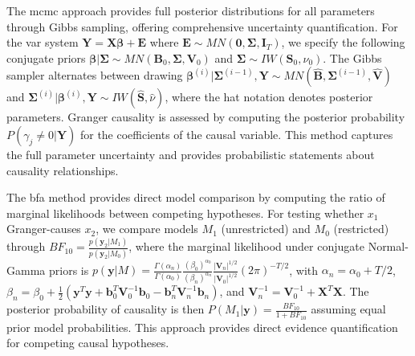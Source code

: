 \documentclass[preprint, 3p,
authoryear]{elsarticle} %
\begin{document}
The \gls{mcmc} approach provides full posterior distributions for all
parameters through Gibbs sampling, offering comprehensive uncertainty
quantification. For the \gls{var} system
\(\mathbf{Y} = \mathbf{X}\boldsymbol{\beta} + \mathbf{E}\) where
\(\mathbf{E} \sim MN(\mathbf{0}, \boldsymbol{\Sigma}, \mathbf{I}_T)\),
we specify the following conjugate priors
\(\boldsymbol{\beta} | \boldsymbol{\Sigma} \sim MN(\mathbf{B}_0, \boldsymbol{\Sigma}, \mathbf{V}_0)\)
and \(\boldsymbol{\Sigma} \sim IW(\mathbf{S}_0, \nu_0)\). The Gibbs
sampler alternates between drawing
\(\boldsymbol{\beta}^{(i)} | \boldsymbol{\Sigma}^{(i-1)}, \mathbf{Y} \sim MN(\hat{\mathbf{B}}, \boldsymbol{\Sigma}^{(i-1)}, \hat{\mathbf{V}})\)
and
\(\boldsymbol{\Sigma}^{(i)} | \boldsymbol{\beta}^{(i)}, \mathbf{Y} \sim IW(\hat{\mathbf{S}}, \hat{\nu})\),
where the hat notation denotes posterior parameters. Granger causality
is assessed by computing the posterior probability
\(P(\gamma_j \neq 0 | \mathbf{Y})\) for the coefficients of the causal
variable. This method captures the full parameter uncertainty and
provides probabilistic statements about causality relationships.

The \gls{bfa} method provides direct model comparison by computing the
ratio of marginal likelihoods between competing hypotheses. For testing
whether \(x_1\) Granger-causes \(x_2\), we compare models \(M_1\)
(unrestricted) and \(M_0\) (restricted) through
\(BF_{10} = \frac{p(\mathbf{y}_2 | M_1)}{p(\mathbf{y}_2 | M_0)}\), where
the marginal likelihood under conjugate Normal-Gamma priors is
\(p(\mathbf{y} | M) = \frac{\Gamma(\alpha_n)}{\Gamma(\alpha_0)} \frac{(\beta_0)^{\alpha_0}}{(\beta_n)^{\alpha_n}} \frac{|\mathbf{V}_n|^{1/2}}{|\mathbf{V}_0|^{1/2}} (2\pi)^{-T/2}\),
with \(\alpha_n = \alpha_0 + T/2\),
\(\beta_n = \beta_0 + \frac{1}{2}(\mathbf{y}^T\mathbf{y} + \mathbf{b}_0^T\mathbf{V}_0^{-1}\mathbf{b}_0 - \mathbf{b}_n^T\mathbf{V}_n^{-1}\mathbf{b}_n)\),
and \(\mathbf{V}_n^{-1} = \mathbf{V}_0^{-1} + \mathbf{X}^T\mathbf{X}\).
The posterior probability of causality is then
\(P(M_1 | \mathbf{y}) = \frac{BF_{10}}{1 + BF_{10}}\) assuming equal
prior model probabilities. This approach provides direct evidence
quantification for competing causal hypotheses.
\end{document}
